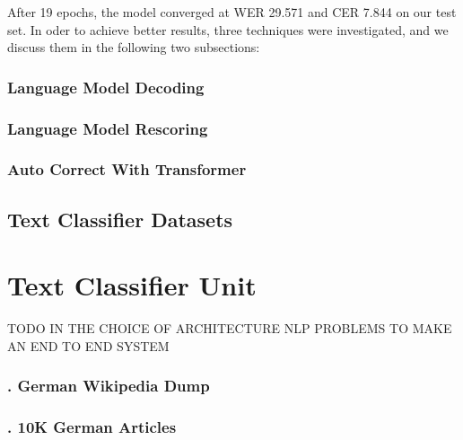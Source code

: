 After 19 epochs, the model converged at \ac{WER} 29.571 and \ac{CER} 7.844 on our test set. In oder to achieve better results, three techniques were investigated, and we discuss them in the following two subsections:

\subsubsection{Language Model Decoding}


\subsubsection{Language Model Rescoring}


\subsubsection{Auto Correct With Transformer}







 	






































\subsection{Text Classifier Datasets}
\label{meth:sub2}

\section{Text Classifier Unit} 
\label{meth:s3}

TODO IN THE CHOICE OF ARCHITECTURE NLP PROBLEMS TO MAKE AN END TO END SYSTEM


\subsubsection{. German Wikipedia Dump}
\label{meth:subsub4}
\subsubsection{. 10K German Articles}
\label{meth:subsub5}

